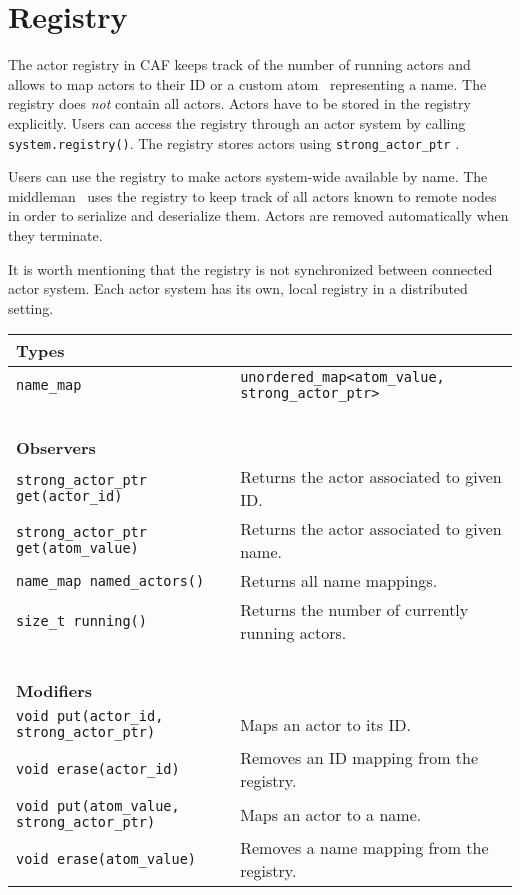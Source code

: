 \section{Registry}
\label{registry}

The actor registry in CAF keeps track of the number of running actors and
allows to map actors to their ID or a custom atom~ representing a
name. The registry does \emph{not} contain all actors. Actors have to be stored
in the registry explicitly. Users can access the registry through an actor
system by calling \lstinline^system.registry()^. The registry stores actors
using \lstinline^strong_actor_ptr^ .

Users can use the registry to make actors system-wide available by name. The
middleman~ uses the registry to keep track of all actors known
to remote nodes in order to serialize and deserialize them. Actors are removed
automatically when they terminate.

It is worth mentioning that the registry is not synchronized between connected
actor system. Each actor system has its own, local registry in a distributed
setting.

\begin{center}
\begin{tabular}{ll}
  \textbf{Types} & ~ \\
  \hline
  \lstinline^name_map^ & \lstinline^unordered_map<atom_value, strong_actor_ptr>^ \\
  \hline
  ~ & ~ \\ \textbf{Observers} & ~ \\
  \hline
  \lstinline^strong_actor_ptr get(actor_id)^ & Returns the actor associated to given ID. \\
  \hline
  \lstinline^strong_actor_ptr get(atom_value)^ & Returns the actor associated to given name. \\
  \hline
  \lstinline^name_map named_actors()^ & Returns all name mappings. \\
  \hline
  \lstinline^size_t running()^ & Returns the number of currently running actors. \\
  \hline
  ~ & ~ \\ \textbf{Modifiers} & ~ \\
  \hline
  \lstinline^void put(actor_id, strong_actor_ptr)^ & Maps an actor to its ID. \\
  \hline
  \lstinline^void erase(actor_id)^ & Removes an ID mapping from the registry. \\
  \hline
  \lstinline^void put(atom_value, strong_actor_ptr)^ & Maps an actor to a name. \\
  \hline
  \lstinline^void erase(atom_value)^ & Removes a name mapping from the registry. \\
  \hline
\end{tabular}
\end{center}
